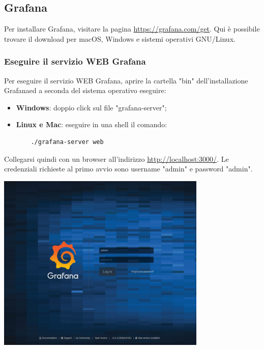 \subsection{Grafana}
Per installare Grafana\glo, visitare la pagina \url{https://grafana.com/get}. Qui è possibile trovare il download per macOS, Windows e sistemi operativi GNU/Linux.
\subsubsection{Eseguire il servizio WEB Grafana} Per eseguire il servizio WEB Grafana\glo, aprire la cartella "bin" dell'installazione Grafana\glosp ed a seconda del sistema operativo eseguire:
\begin{itemize}
	\item \textbf{Windows}: doppio click sul file "grafana-server";
	\item \textbf{Linux e Mac}: eseguire in una shell il comando:
	\begin{verbatim}
	./grafana-server web
	\end{verbatim}
\end{itemize}
Collegarsi quindi con un browser all'indirizzo \url{http://localhost:3000/}. Le credenziali richieste al primo avvio sono username "admin" e password "admin".
\begin{center}
	\includegraphics[width=10cm,height=\textheight,keepaspectratio]{img/grafana-login.png}
\end{center}

